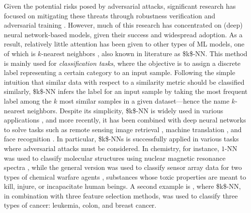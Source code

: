 Given the potential risks posed by adversarial attacks, significant research has focused on mitigating these threats through robustness verification \cite{pmlr-v80-wong18a, Zhang2018} and adversarial training \cite{goodfellow2015, Carlini17, Biggio18}. However, much of this research has concentrated on (deep) neural network-based models, given their success and widespread adoption. As a result, relatively little attention has been given to other types of \acs{ML} models, one of which is $k$-nearest neighbors \cite{Fix1952DiscriminatoryA, fix1989discriminatory}, also known in literature as \acs{$k$-NN}. This method is mainly used for \emph{classification tasks}, where the objective is to assign a discrete label representing a certain category to an input sample. Following the simple intuition that similar data with respect to a similarity metric should be classified similarly, \acs{$k$-NN} infers the label for an input sample by taking the most frequent label among the $k$ most similar samples in a given dataset—hence the name $k$-nearest neighbors. Despite its simplicity, \acs{$k$-NN} is widely used in various applications \cite{Wu2007Top1A, Kramer2013}, and more recently, it has been combined with deep neural networks to solve tasks such as remote sensing image retrieval \cite{Ye2019ANR}, machine translation \cite{khandelwal2021}, and face recognition \cite{Nakada2017AcFRAF}. In particular, \acsp{$k$-NN} is successfully applied in various tasks where adversarial attacks must be considered. In chemistry, for instance, $1$-NN was used to classify molecular structures using nuclear magnetic resonance spectra \cite{Kowalski1972}, while the general version was used to classify sensor array data for two types of chemical warfare agents \cite{Shaffer1999ACS}, substances whose toxic properties are meant to kill, injure, or incapacitate human beings. A second example is \cite{tarek17}, where \acs{$k$-NN}, in combination with three feature selection methods, was used to classify three types of cancer: leukemia, colon, and breast cancer.

